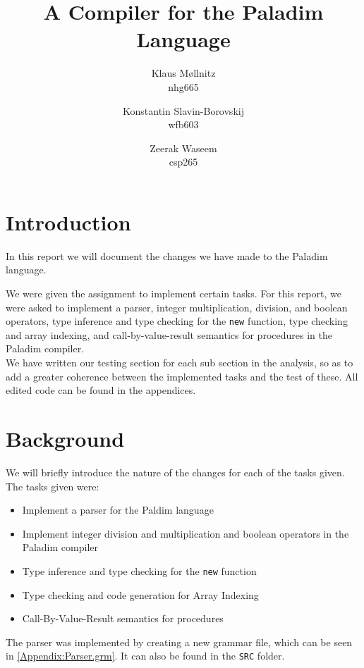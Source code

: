 \documentclass[10pt]{article}
\title{A Compiler for the \textbf{Paladim} Language}
\author{
    Klaus Møllnitz\\
    nhg665
  \and
    Konstantin Slavin-Borovskij\\
    wfb603
  \and
    Zeerak Waseem\\
    csp265
}
\begin{document}
\maketitle

\newpage
\tableofcontents
\section{Introduction}
In this report we will document the changes we have made to the Paladim language. 

We were given the assignment to implement certain tasks. For this report, we were asked to implement a parser, integer multiplication, division, and boolean operators, type inference and type checking for the \texttt{new} function, type checking and array indexing, and call-by-value-result semantics for procedures in the Paladim compiler.\\

We have written our testing section for each sub section in the analysis, so as to add a greater coherence between the implemented tasks and the test of these. All edited code can be found in the appendices.

\section{Background}

We will briefly introduce the nature of the changes for each of the tasks given. The tasks given were:
\begin{itemize}
\item Implement a parser for the Paldim language
\item Implement integer division and multiplication and boolean operators in the Paladim compiler
\item Type inference and type checking for the \texttt{new} function
\item Type checking and code generation for Array Indexing
\item Call-By-Value-Result semantics for procedures
\end{itemize}

The parser was implemented by creating a new grammar file, which can be seen in \ref{Appendix:Parser.grm}. It can also be found in the \texttt{SRC} folder.\\
\end{document}
